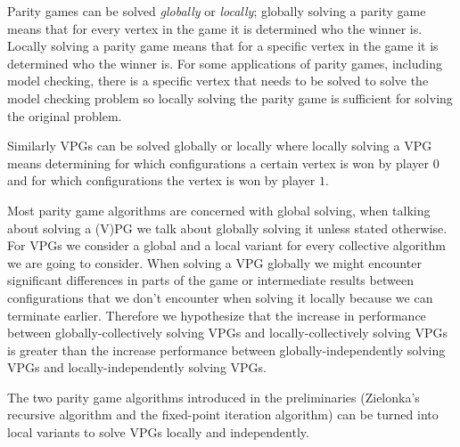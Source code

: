 Parity games can be solved \textit{globally} or \textit{locally}; globally solving a parity game means that for every vertex in the game it is determined who the winner is. Locally solving a parity game means that for a specific vertex in the game it is determined who the winner is. For some applications of parity games, including model checking, there is a specific vertex that needs to be solved to solve the model checking problem so locally solving the parity game is sufficient for solving the original problem.

Similarly VPGs can be solved globally or locally where locally solving a VPG means determining for which configurations a certain vertex is won by player $0$ and for which configurations the vertex is won by player $1$.

Most parity game algorithms are concerned with global solving, when talking about solving a (V)PG we talk about globally solving it unless stated otherwise. For VPGs we consider a global and a local variant for every collective algorithm we are going to consider. When solving a VPG globally we might encounter significant differences in parts of the game or intermediate results between configurations that we don't encounter when solving it locally because we can terminate earlier. Therefore we hypothesize that the increase in performance between globally-collectively solving VPGs and locally-collectively solving VPGs is greater than the increase performance between globally-independently solving VPGs and locally-independently solving VPGs.

The two parity game algorithms introduced in the preliminaries (Zielonka's recursive algorithm and the fixed-point iteration algorithm) can be turned into local variants to solve VPGs locally and independently.

